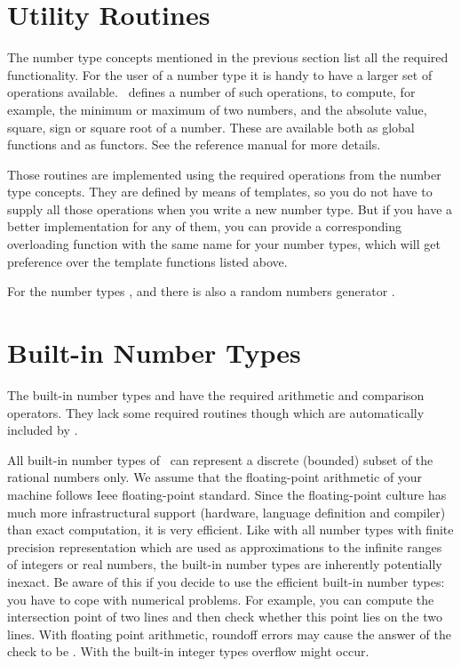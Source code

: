 \section{Utility Routines}

The number type concepts mentioned in the previous section list all 
the required functionality.
For the user of a number type it is handy to have a larger set of
operations available. \cgal\ defines a number of such operations,
to compute, for example, the minimum or maximum of two numbers, and the
absolute value, square, sign or square root of a number.  These are
available both as global functions and as functors.  See the reference
manual for more details.

Those routines are implemented using the required operations from the
number type concepts. They are defined by means of templates, so you do not
have to supply all those operations when you write  a new number type.
But if you have a better implementation for any of them, you can provide a 
corresponding overloading function with the same name for your number types,
which will get preference over the template functions listed above.

For the number types , and  there is
also a random numbers generator .

\section{Built-in Number Types}

The built-in number types  and  have the
required arithmetic and comparison operators. They lack some required
routines though which are automatically included by \cgal.

All built-in number types of \CC\ can represent a discrete (bounded)
subset of the rational numbers only.  We assume that the
floating-point arithmetic of your machine follows {\sc Ieee}
floating-point standard.  Since the floating-point culture has much
more infrastructural support (hardware, language definition and
compiler) than exact computation, it is very efficient.
Like with all number types with finite precision representation
which are used as approximations to the infinite ranges of 
integers or real numbers, the built-in number types are inherently
potentially inexact.
Be aware of this if you decide to use the efficient built-in 
number types: you have to cope with numerical problems.  
For example, you can compute the intersection point of two lines and 
then check whether this point lies on the two lines. 
With floating point arithmetic,
roundoff errors may cause the answer of the check to be . 
With the built-in integer types overflow might occur.


